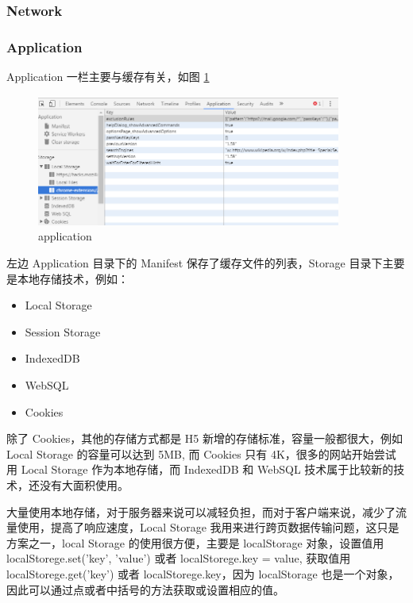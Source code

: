\documentclass[UTF8]{ctexbook}
\begin{document}
{{            \subsubsection{Network}
              \label{subsubsec:network}



            \subsubsection{Application}
              \label{subsubsec:application}
                Application 一栏主要与缓存有关，如图 \ref{fig:cr_application}
                \begin{figure}[H]
                  \centering
                  \includegraphics[width=10cm]{./img/cr_application.png}
                  \caption{application}
                  \label{fig:cr_application}
                \end{figure}
                左边 Application 目录下的 Manifest 保存了缓存文件的列表，Storage 目录下主要是本地存储技术，例如：
                \begin{itemize}
                  \item Local Storage
                  \item Session Storage
                  \item IndexedDB
                  \item WebSQL
                  \item Cookies
                \end{itemize}
                除了 Cookies，其他的存储方式都是 H5 新增的存储标准，容量一般都很大，例如 Local Storage 的容量可以达到 5MB, 而 Cookies 只有 4K，很多的网站开始尝试用 Local Storage 作为本地存储，而 IndexedDB 和 WebSQL 技术属于比较新的技术，还没有大面积使用。
                \par
                大量使用本地存储，对于服务器来说可以减轻负担，而对于客户端来说，减少了流量使用，提高了响应速度，Local Storage 我用来进行跨页数据传输问题，这只是方案之一，local Storage 的使用很方便，主要是 localStorage 对象，设置值用 localStorege.set('key', 'value') 或者 localStorege.key = value, 获取值用 localStorege.get('key') 或者 localStorege.key，因为 localStorage 也是一个对象，因此可以通过点或者中括号的方法获取或设置相应的值。
}}
\end{document}
